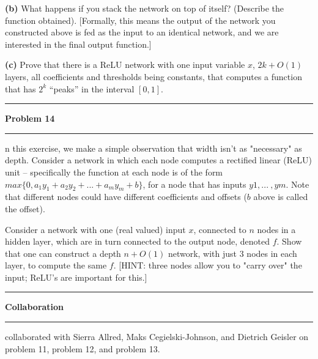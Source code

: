 \documentclass[11pt]{article}
\newcommand\question[2]{\vspace{.25in}\hrule\textbf{#1}\vspace{.5em}\hrule\vspace{.10in}}
\renewcommand\part[1]{\vspace{.10in}\textbf{(#1)}}
\begin{document}

\part{b} What happens if you stack the network on top of itself? (Describe the function obtained). [Formally, this means the output of the network you constructed above is fed as the input to an identical network, and we are interested in the final output function.]


\part{c} Prove that there is a ReLU network with one input variable $x$, $2k+O(1)$ layers, all coefficients and thresholds being constants, that computes a function that has $2^k$ ``peaks'' in the interval $[0,1]$.


\question{Problem 14}

In this exercise, we make a simple observation that width isn't as "necessary" as depth. Consider a network in which each node computes a rectified linear (ReLU) unit -- specifically the function at each node is of the form $max \{ 0,a_1y_1+a_2y_2+ ... +a_my_m + b \}$, for a node that has inputs $y1, ... \ ,ym$. Note that different nodes could have different coefficients and offsets ($b$ above is called the offset).

Consider a network with one (real valued) input $x$, connected to $n$ nodes in a hidden layer, which are in turn connected to the output node, denoted $f$. Show that one can construct a depth $n + O(1)$ network, with just 3 nodes in each layer, to compute the same $f$. [HINT: three nodes allow you to "carry over" the input; ReLU's are important for this.]


\newpage

\question{Collaboration}

I collaborated with Sierra Allred, Maks Cegielski-Johnson, and Dietrich Geisler on problem 11, problem 12, and problem 13. \newline
\end{document}
